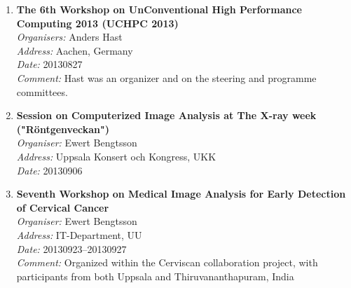 \begin{enumerate}
\item 
{\bf  The 6th Workshop on UnConventional High Performance Computing 2013 (UCHPC 2013)}~\\
{\em Organisers:} Anders Hast~\\
{\em Address:} Aachen, Germany~\\
{\em Date:} 20130827~\\
{\em Comment:} Hast was an organizer and on the steering and programme committees.


\item 
{\bf Session on Computerized Image Analysis at The X-ray week ("R\"{o}ntgenveckan")}~\\
{\em Organiser:} Ewert Bengtsson~\\
{\em Address:} Uppsala Konsert och Kongress, UKK~\\
{\em Date:} 20130906

\item 
{\bf Seventh Workshop on Medical Image Analysis for Early Detection of Cervical Cancer}~\\
{\em Organiser:} Ewert Bengtsson~\\
{\em Address:} IT-Department, UU~\\
{\em Date:} 20130923--20130927~\\
{\em Comment:} Organized within the Cerviscan collaboration project, with participants from both Uppsala and Thiruvananthapuram, India


\end{enumerate}
